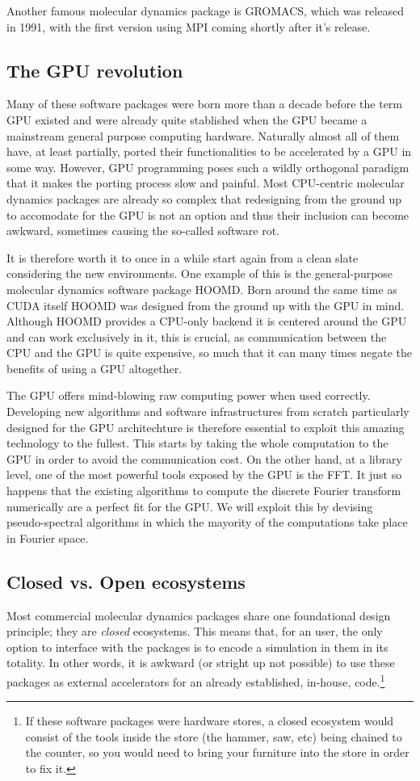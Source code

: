 \documentclass[ twoside,openright,titlepage,numbers=noenddot,%
headinclude,footinclude,cleardoublepage=empty,abstract=on,
BCOR=5mm,paper=a4,fontsize=11pt, dvipsnames
]{scrreprt}
\newcommand{\gpu}{\gls{GPU}\xspace}
\begin{document}
Another famous molecular dynamics package is GROMACS, which was released in 1991, with the first version using MPI coming shortly after it's release.

\subsection*{The GPU revolution}
Many of these software packages were born more than a decade before the term \gpu existed and were already quite stablished when the \gpu became a mainstream general purpose computing hardware. Naturally almost all of them have, at least partially, ported their functionalities to be accelerated by a \gpu in some way. However, \gpu programming poses such a wildly orthogonal paradigm that it makes the porting process slow and painful. Most CPU-centric molecular dynamics packages are already so complex that redesigning from the ground up to accomodate for the \gpu is not an option and thus their inclusion can become awkward, sometimes causing the so-called software rot.

It is therefore worth it to once in a while start again from a clean slate considering the new environments. One example of this is the general-purpose molecular dynamics software package HOOMD\cite{Anderson2008}. Born around the same time as CUDA itself HOOMD was designed from the ground up with the \gpu in mind. Although HOOMD provides a CPU-only backend it is centered around the \gpu and can work exclusively in it, this is crucial, as communication between the CPU and the \gpu is quite expensive, so much that it can many times negate the benefits of using a \gpu altogether.

The \gpu offers mind-blowing raw computing power when used correctly. Developing new algorithms and software infrastructures from scratch particularly designed for the \gpu architechture is therefore essential to exploit this amazing technology to the fullest. This starts by taking the whole computation to the \gpu in order to avoid the communication cost. On the other hand, at a library level, one of the most powerful tools exposed by the \gpu is the \gls{FFT}. It just so happens that the existing algorithms to compute the discrete Fourier transform numerically are a perfect fit for the \gpu. We will exploit this by devising pseudo-spectral algorithms in which the mayority of the computations take place in Fourier space.

\subsection*{Closed vs. Open ecosystems}
Most commercial molecular dynamics packages share one foundational design principle; they are \emph{closed} ecosystems. This means that, for an user, the only option to interface with the packages is to encode a simulation in them in its totality. In other words, it is awkward (or stright up not possible) to use these packages as external accelerators for an already established, in-house, code.\footnote{If these software packages were hardware stores, a closed ecosystem would consist of the tools inside the store (the hammer, saw, etc) being chained to the counter, so you would need to bring your furniture into the store in order to fix it.}  
\end{document}
